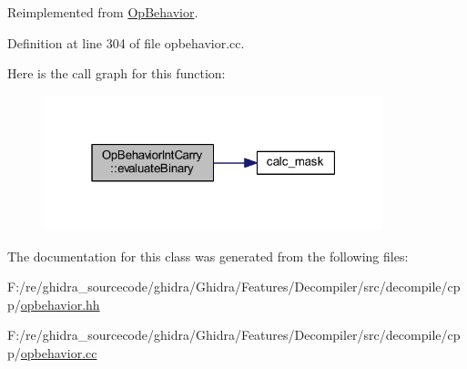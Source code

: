Reimplemented from \mbox{\hyperlink{class_op_behavior_aeeed3af7aa35264b31a1f182884214a9}{Op\+Behavior}}.



Definition at line 304 of file opbehavior.\+cc.

Here is the call graph for this function\+:
\nopagebreak
\begin{figure}[H]
\begin{center}
\leavevmode
\includegraphics[width=280pt]{class_op_behavior_int_carry_a027acae9fdc342d2e15244189e252367_cgraph}
\end{center}
\end{figure}


The documentation for this class was generated from the following files\+:\begin{DoxyCompactItemize}
\item 
F\+:/re/ghidra\+\_\+sourcecode/ghidra/\+Ghidra/\+Features/\+Decompiler/src/decompile/cpp/\mbox{\hyperlink{opbehavior_8hh}{opbehavior.\+hh}}\item 
F\+:/re/ghidra\+\_\+sourcecode/ghidra/\+Ghidra/\+Features/\+Decompiler/src/decompile/cpp/\mbox{\hyperlink{opbehavior_8cc}{opbehavior.\+cc}}\end{DoxyCompactItemize}
